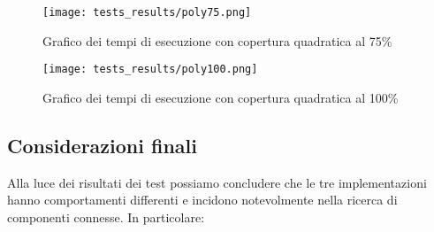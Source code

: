 \begin{figure}[!h]
    \begin{adjustbox}{center}
        \begin{minipage}{0.65\textwidth}
            \centering
            \captionsetup{justification=centering}
            \texttt{[image: tests\_results/poly75.png]}
            \caption{Grafico dei tempi di esecuzione con copertura quadratica al 75\%}
            \label{fig:poly75}
        \end{minipage}\hfill
        \begin{minipage}{0.65\textwidth}
            \centering
            \captionsetup{justification=centering}
            \texttt{[image: tests\_results/poly100.png]}
            \caption{Grafico dei tempi di esecuzione con copertura quadratica al 100\%}
            \label{fig:poly100}
        \end{minipage}
    \end{adjustbox}
\end{figure}
\newpage

\subsection{Considerazioni finali}

Alla luce dei risultati dei test possiamo concludere che le tre implementazioni hanno comportamenti differenti
e incidono notevolmente nella ricerca di componenti connesse. In particolare:

